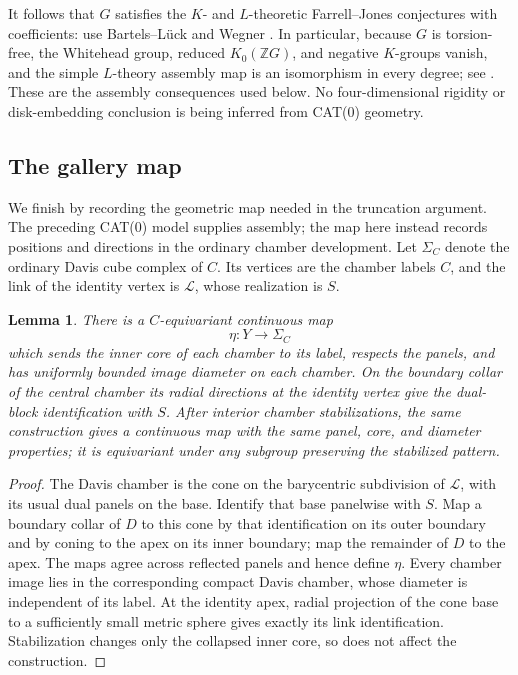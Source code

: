 \documentclass[11pt]{article}
\newtheorem{lemma}[theorem]{Lemma}
\theoremstyle{definition}
\theoremstyle{remark}
\newcommand{\Z}{\mathbb Z}
\begin{document}
It follows that $G$ satisfies the $K$- and $L$-theoretic Farrell--Jones
conjectures with coefficients: use Bartels--L\"uck
\cite[Theorem~B(ii)]{BL} and Wegner
\cite[Theorems~1.1 and~3.4]{Wegner}.  In particular, because $G$ is
torsion-free, the Whitehead group, reduced $K_0(\Z G)$, and negative
$K$-groups vanish, and the simple $L$-theory assembly map is an
isomorphism in every degree; see \cite[Proposition~0.3(i)]{BL}.
These are the assembly consequences used below.  No four-dimensional
rigidity or disk-embedding conclusion is being inferred from CAT(0)
geometry.

\subsection{The gallery map}

We finish by recording the geometric map needed in the truncation
argument. The preceding CAT(0) model supplies assembly; the map here
instead records positions and directions in the ordinary chamber
development. Let $\Sigma_C$ denote the ordinary Davis cube complex of
$C$.  Its vertices are the chamber labels $C$, and the link of the
identity vertex is $\mathcal L$, whose realization is $S$.

\begin{lemma}
\label{rf:davis-map}
There is a $C$-equivariant continuous map
\[
 \eta:Y\longrightarrow\Sigma_C
\]
which sends the inner core of each chamber to its label, respects
the panels, and has uniformly bounded image diameter on each chamber.
On the boundary collar of the central chamber its radial directions
at the identity vertex give the dual-block identification with $S$.
After interior chamber stabilizations, the same construction gives a
continuous map with the same panel, core, and diameter properties;
it is equivariant under any subgroup preserving the stabilized pattern.
\end{lemma}

\begin{proof}
The Davis chamber is the cone on the barycentric subdivision of
$\mathcal L$, with its usual dual panels on the base.  Identify that
base panelwise with $S$.  Map a boundary collar of $D$ to this cone
by that identification on its outer boundary and by coning to the
apex on its inner boundary; map the remainder of $D$ to the apex.
The maps agree across reflected panels and hence define $\eta$.
Every chamber image lies in the corresponding compact Davis chamber,
whose diameter is independent of its label.  At the identity apex,
radial projection of the cone base to a sufficiently small metric
sphere gives exactly its link identification.  Stabilization changes
only the collapsed inner core, so does not affect the construction.
\end{proof}
\end{document}
